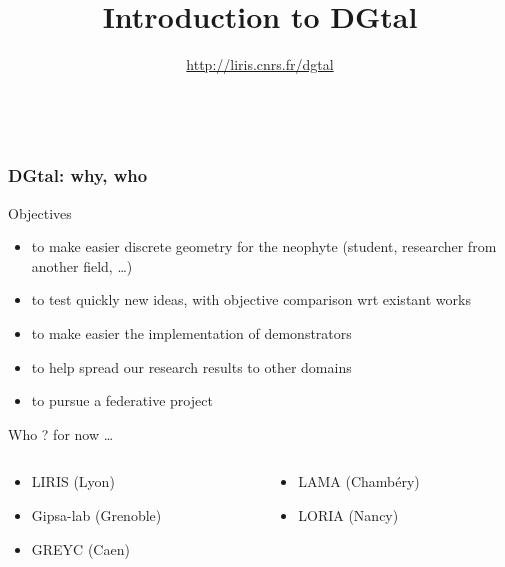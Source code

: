 \documentclass[8pt]{beamer}
\title[Workgroup Digital Geometry]{Introduction to
  DGtal}
\subtitle{\url{http://liris.cnrs.fr/dgtal}}
\author{~}
\begin{document}
\small






\begin{frame}[plain]
  \titlepage
\end{frame}

\begin{frame}%
  \frametitle{DGtal: why, who}
  
  \small
  \begin{block}{Objectives}
    \small
    \begin{itemize}
    \item to make easier discrete geometry for the neophyte (student, researcher from another field, \ldots)
    \item to test quickly new ideas, with objective comparison wrt
      existant works
    \item to make easier the implementation of demonstrators
    \item to help spread our research results to other domains
    \item to pursue a federative project
    \end{itemize}
  \end{block}

  \small
  \begin{block}{Who ? for now \ldots}
    \small
    \begin{columns}
      \begin{column}{0.45\textwidth}
        \begin{itemize}
        \item LIRIS (Lyon)      
        \item Gipsa-lab (Grenoble)
        \item GREYC (Caen)
        \end{itemize}
      \end{column}
      \begin{column}{0.45\textwidth}
        \begin{itemize}
        \item LAMA (Chambéry)
        \item LORIA (Nancy)
        \end{itemize}
      \end{column}
    \end{columns}
  \end{block}
\end{frame}
\end{document}
